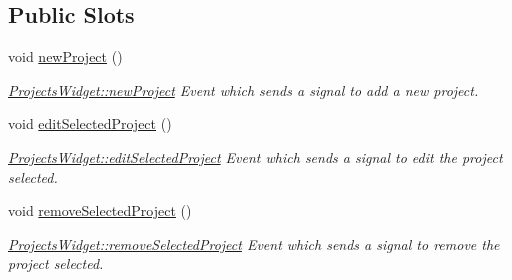 \subsection*{Public Slots}
\begin{DoxyCompactItemize}
\item 
\hypertarget{classProjectsWidget_a9a3e158093ed435a68d4d9874a22a128}{void \hyperlink{classProjectsWidget_a9a3e158093ed435a68d4d9874a22a128}{new\+Project} ()}\label{classProjectsWidget_a9a3e158093ed435a68d4d9874a22a128}

\begin{DoxyCompactList}\small\item\em \hyperlink{classProjectsWidget_a9a3e158093ed435a68d4d9874a22a128}{Projects\+Widget\+::new\+Project} Event which sends a signal to add a new project. \end{DoxyCompactList}\item 
\hypertarget{classProjectsWidget_a026e17f035717e382f4afca6896a72d3}{void \hyperlink{classProjectsWidget_a026e17f035717e382f4afca6896a72d3}{edit\+Selected\+Project} ()}\label{classProjectsWidget_a026e17f035717e382f4afca6896a72d3}

\begin{DoxyCompactList}\small\item\em \hyperlink{classProjectsWidget_a026e17f035717e382f4afca6896a72d3}{Projects\+Widget\+::edit\+Selected\+Project} Event which sends a signal to edit the project selected. \end{DoxyCompactList}\item 
\hypertarget{classProjectsWidget_a038205ca1dee68dadae84e31dabfd7fc}{void \hyperlink{classProjectsWidget_a038205ca1dee68dadae84e31dabfd7fc}{remove\+Selected\+Project} ()}\label{classProjectsWidget_a038205ca1dee68dadae84e31dabfd7fc}

\begin{DoxyCompactList}\small\item\em \hyperlink{classProjectsWidget_a038205ca1dee68dadae84e31dabfd7fc}{Projects\+Widget\+::remove\+Selected\+Project} Event which sends a signal to remove the project selected. \end{DoxyCompactList}\end{DoxyCompactItemize}
